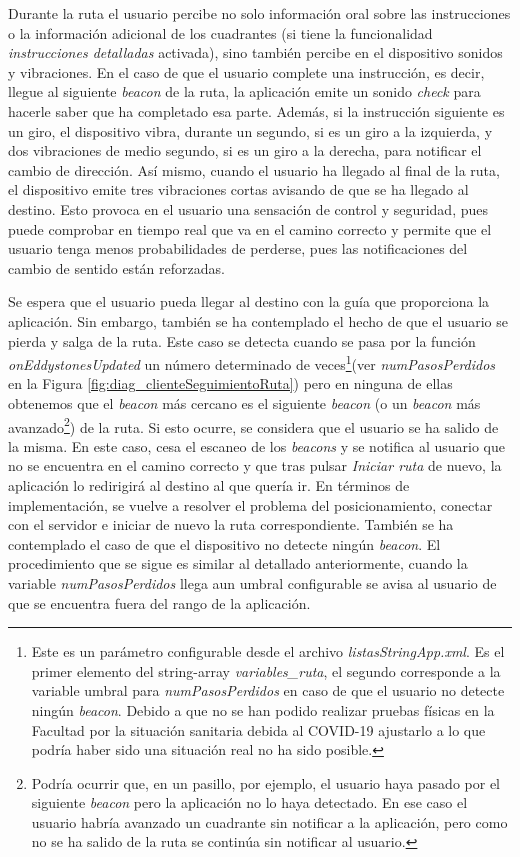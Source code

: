 \begin{itemize}
	Durante la ruta el usuario percibe no solo información oral sobre las instrucciones o la información adicional de los cuadrantes (si tiene la funcionalidad \textit{instrucciones detalladas} activada), sino también percibe en el dispositivo sonidos y vibraciones. En el caso de que el usuario complete una instrucción, es decir, llegue al siguiente \textit{beacon} de la ruta, la aplicación emite un sonido \textit{check} para hacerle saber que ha completado esa parte. Además, si la instrucción siguiente es un giro, el dispositivo vibra, durante un segundo, si es un giro a la izquierda, y dos vibraciones de medio segundo, si es un giro a la derecha, para notificar el cambio de dirección. Así mismo, cuando el usuario ha llegado al final de la ruta, el dispositivo emite tres vibraciones cortas avisando de que se ha llegado al destino. Esto provoca en el usuario una sensación de control y seguridad, pues puede comprobar en tiempo real que va en el camino correcto y permite que el usuario tenga menos probabilidades de perderse, pues las notificaciones del cambio de sentido están reforzadas.
	
	Se espera que el usuario pueda llegar al destino con la guía que proporciona la aplicación. Sin embargo, también se ha contemplado el hecho de que el usuario se pierda y salga de la ruta. Este caso se detecta cuando se pasa por la función \textit{onEddystonesUpdated} un número determinado de veces\footnote{Este es un parámetro configurable desde el archivo \textit{listasStringApp.xml}. Es el primer elemento del string-array \textit{variables\_ruta}, el segundo corresponde a la variable umbral para \textit{numPasosPerdidos} en caso de que el usuario no detecte ningún \textit{beacon}. Debido a que no se han podido realizar pruebas físicas en la Facultad por la situación sanitaria debida al COVID-19 ajustarlo a lo que podría haber sido una situación real no ha sido posible.}(ver \textit{numPasosPerdidos} en la Figura \ref{fig:diag_clienteSeguimientoRuta}) pero en ninguna de ellas obtenemos que el \textit{beacon} más cercano es el siguiente \textit{beacon} (o un \textit{beacon} más avanzado\footnote{Podría ocurrir que, en un pasillo, por ejemplo, el usuario haya pasado por el siguiente \textit{beacon} pero la aplicación no lo haya detectado. En ese caso el usuario habría avanzado un cuadrante sin notificar a la aplicación, pero como no se ha salido de la ruta se continúa sin notificar al usuario.}) de la ruta. Si esto ocurre, se considera que el usuario se ha salido de la misma. En este caso, cesa el escaneo de los \textit{beacons} y se notifica al usuario que no se encuentra en el camino correcto y que tras pulsar \textit{Iniciar ruta} de nuevo, la aplicación lo redirigirá al destino al que quería ir. En términos de implementación, se vuelve a resolver el problema del posicionamiento, conectar con el servidor e iniciar de nuevo la ruta correspondiente. También se ha contemplado el caso de que el dispositivo no detecte ningún \textit{beacon}. El procedimiento que se sigue es similar al detallado anteriormente, cuando la variable \textit{numPasosPerdidos} llega aun umbral configurable se avisa al usuario de que se encuentra fuera del rango de la aplicación.
	
\end{itemize}


